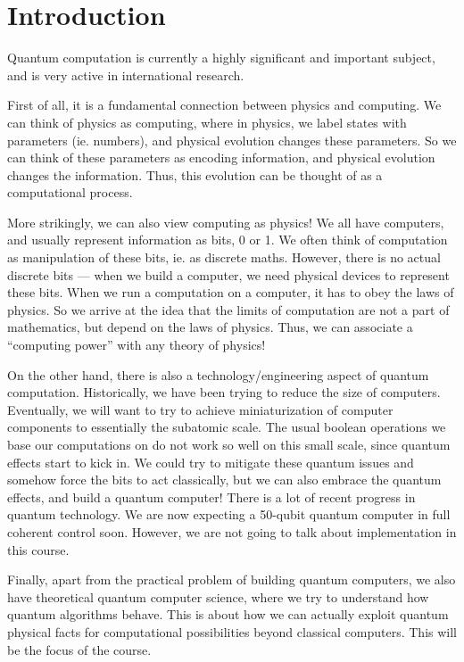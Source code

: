 \documentclass[a4paper]{article}
\begin{document}
\setcounter{section}{-1}
\section{Introduction}
Quantum computation is currently a highly significant and important subject, and is very active in international research.

First of all, it is a fundamental connection between physics and computing. We can think of physics as computing, where in physics, we label states with parameters (ie. numbers), and physical evolution changes these parameters. So we can think of these parameters as encoding information, and physical evolution changes the information. Thus, this evolution can be thought of as a computational process.

More strikingly, we can also view computing as physics! We all have computers, and usually represent information as bits, 0 or 1. We often think of computation as manipulation of these bits, ie. as discrete maths. However, there is no actual discrete bits --- when we build a computer, we need physical devices to represent these bits. When we run a computation on a computer, it has to obey the laws of physics. So we arrive at the idea that the limits of computation are not a part of mathematics, but depend on the laws of physics. Thus, we can associate a ``computing power'' with any theory of physics!

On the other hand, there is also a technology/engineering aspect of quantum computation. Historically, we have been trying to reduce the size of computers. Eventually, we will want to try to achieve miniaturization of computer components to essentially the subatomic scale. The usual boolean operations we base our computations on do not work so well on this small scale, since quantum effects start to kick in. We could try to mitigate these quantum issues and somehow force the bits to act classically, but we can also embrace the quantum effects, and build a quantum computer! There is a lot of recent progress in quantum technology. We are now expecting a 50-qubit quantum computer in full coherent control soon. However, we are not going to talk about implementation in this course.

Finally, apart from the practical problem of building quantum computers, we also have theoretical quantum computer science, where we try to understand how quantum algorithms behave. This is about how we can actually exploit quantum physical facts for computational possibilities beyond classical computers. This will be the focus of the course.
\end{document}
